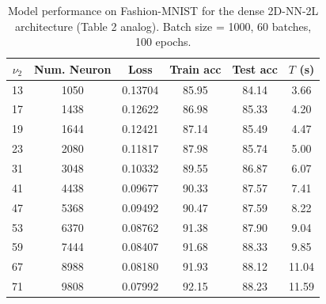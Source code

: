 \begin{table}[htbp]
\centering
\caption{Model performance on Fashion-MNIST for the dense 2D-NN-2L architecture (Table 2 analog). Batch size = 1000, 60 batches, 100 epochs.}
\label{tab:fashion_mnist_dense_sweep}
\begin{tabular}{cccccc}
\toprule
$\nu_2$ & Num. Neuron & Loss    & Train acc & Test acc & $T$ (s) \\
\midrule
13      & 1050  & 0.13704 & 85.95 &84.14 & 3.66  \\
17      & 1438  & 0.12622 & 86.98 &85.33 & 4.20  \\
19      & 1644  & 0.12421 & 87.14 &85.49 & 4.47  \\
23      & 2080  & 0.11817 & 87.98 &85.74 & 5.00  \\
31      & 3048  & 0.10332 & 89.55 &86.87 & 6.07  \\
41      & 4438  & 0.09677 & 90.33 &87.57 & 7.41  \\
47      & 5368  & 0.09492 & 90.47 &87.59 & 8.22  \\
53      & 6370  & 0.08762 & 91.38 &87.90 & 9.04  \\
59      & 7444  & 0.08407 & 91.68 &88.33 & 9.85  \\
67      & 8988  & 0.08180 & 91.93 &88.12 & 11.04  \\
71      & 9808  & 0.07992 & 92.15 &88.23 & 11.59  \\
\bottomrule
\end{tabular}%
\end{table}
